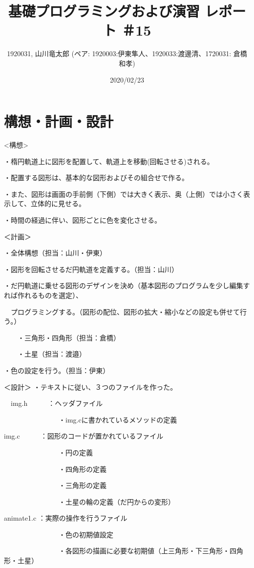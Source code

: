 \documentclass[12pt,a4j]{jarticle}
\begin{document}
\title{基礎プログラミングおよび演習 レポート ＃15}
\author{1920031, 山川竜太郎 (ペア: 1920003:伊東隼人、1920033:渡邊清、1720031: 倉橋和孝)}
\date{2020/02/23}
\maketitle

\section{構想・計画・設計}

<構想>

・楕円軌道上に図形を配置して、軌道上を移動(回転させる)される。

・配置する図形は、基本的な図形およびその組合せで作る。

・また、図形は画面の手前側（下側）では大きく表示、奥（上側）では小さく表示して、立体的に見せる。

・時間の経過に伴い、図形ごとに色を変化させる。

＜計画＞

・全体構想（担当：山川・伊東）

・図形を回転させるだ円軌道を定義する。（担当：山川）

・だ円軌道に乗せる図形のデザインを決め（基本図形のプログラムを少し編集すれば作れるものを選定）、

　プログラミングする。（図形の配位、図形の拡大・縮小などの設定も併せて行う。）

　　・三角形・四角形（担当：倉橋）

　　・土星（担当：渡邉）

・色の設定を行う。（担当：伊東）

＜設計＞
・テキストに従い、３つのファイルを作った。

　img.h　　　：ヘッダファイル

　　　　　　　　・img.cに書かれているメソッドの定義

  img.c　　　：図形のコードが置かれているファイル

　　　　　　　　・円の定義

　　　　　　　　・四角形の定義

　　　　　　　　・三角形の定義

　　　　　　　　・土星の輪の定義（だ円からの変形）

  animate1.c ：実際の操作を行うファイル

　　　　　　　　・色の初期値設定

　　　　　　　　・各図形の描画に必要な初期値（上三角形・下三角形・四角形・土星）
\end{document}
